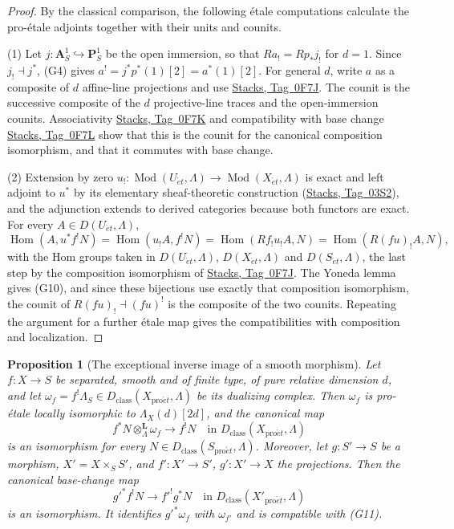 \documentclass[11pt,a4paper]{article}
\numberwithin{equation}{section}
\newtheorem{proposition}[theorem]{Proposition}
\theoremstyle{definition}
\theoremstyle{remark}
\newcommand{\Mod}{\operatorname{Mod}}
\newcommand{\et}{\acute{e}t}
\newcommand{\proet}{\mathrm{pro}\acute{e}t}
\newcommand{\stacks}[1]{\href{https://stacks.math.columbia.edu/tag/#1}{\textnormal{Stacks, Tag~#1}}}
\newcommand{\Hom}{\operatorname{Hom}}
\begin{document}
\begin{proof}
By the classical comparison, the following \'etale computations
calculate the pro-\'etale adjoints together with their units and
counits.

(1) Let \(j:\mathbf A^1_S\hookrightarrow\mathbf P^1_S\) be the open
immersion, so that \(Ra_!=Rp_*j_!\) for \(d=1\). Since \(j_!\dashv j^*\),
(G4) gives \(a^!=j^*p^*(1)[2]=a^*(1)[2]\). For general \(d\), write
\(a\) as a composite of \(d\) affine-line projections and use
\stacks{0F7J}. The counit is the successive composite of the \(d\)
projective-line traces and the open-immersion counits. Associativity
\stacks{0F7K} and compatibility with base change \stacks{0F7L} show
that this is the counit for the canonical composition isomorphism, and
that it commutes with base change.

(2) Extension by zero
\(u_!\colon\Mod(U_{\et},\Lambda)\to\Mod(X_{\et},\Lambda)\) is exact and
left adjoint to \(u^*\) by its elementary sheaf-theoretic construction
(\stacks{03S2}), and
the adjunction extends to derived categories because both functors are
exact. For every \(A\in D(U_{\et},\Lambda)\),
\[
 \Hom(A,u^*f^!N)
  =\Hom(u_!A,f^!N)
  =\Hom(Rf_!u_!A,N)
  =\Hom(R(fu)_!A,N),
\]
with the Hom groups taken in \(D(U_{\et},\Lambda)\),
\(D(X_{\et},\Lambda)\) and \(D(S_{\et},\Lambda)\),
the last step by the composition isomorphism of \stacks{0F7J}. The
Yoneda lemma gives (G10), and since these bijections use exactly that
composition isomorphism, the counit of \(R(fu)_!\dashv(fu)^!\) is the
composite of the two counits. Repeating the argument for a further
\'etale map gives the compatibilities with composition and
localization.
\end{proof}

\begin{proposition}[The exceptional inverse image of a smooth morphism]
\label{b:prop:geo-smooth-tensor}
Let \(f:X\to S\) be separated, smooth and of finite type, of pure
relative dimension \(d\), and let
\(\omega_f=f^!\Lambda_S\in D_{\mathrm{class}}(X_{\proet},\Lambda)\) be its dualizing
complex. Then \(\omega_f\) is pro-\'etale locally isomorphic to
\(\Lambda_X(d)[2d]\), and the canonical map
\[
 f^*N\otimes_\Lambda^{\mathbf L}\omega_f
       \longrightarrow f^!N
       \quad\text{in }D_{\mathrm{class}}(X_{\proet},\Lambda)  \tag{G11}
\]
is an isomorphism for every \(N\in D_{\mathrm{class}}(S_{\proet},\Lambda)\). Moreover, let
\(g:S'\to S\) be a morphism, \(X'=X\times_SS'\), and
\(f':X'\to S'\), \(g':X'\to X\) the projections. Then the canonical
base-change map
\[
 g'^*f^!N\longrightarrow f'^!g^*N
       \quad\text{in }D_{\mathrm{class}}(X'_{\proet},\Lambda)  \tag{G12}
\]
is an isomorphism. It identifies \(g'^*\omega_f\) with
\(\omega_{f'}\) and is compatible with (G11).
\end{proposition}
\end{document}
